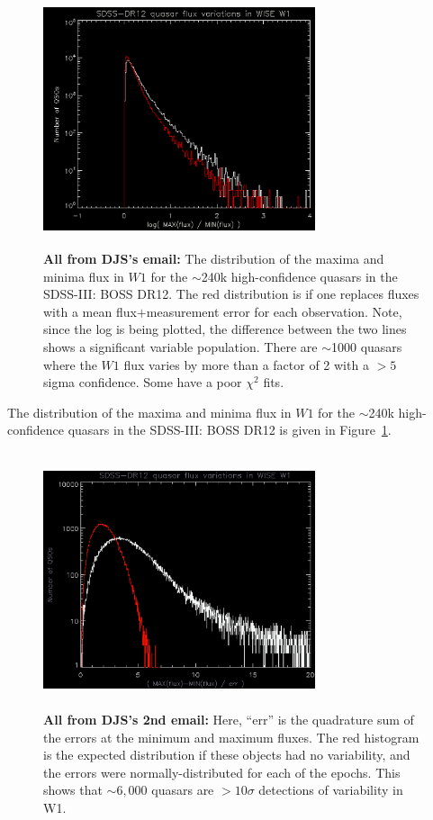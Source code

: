 \documentclass{emulateapj}
\begin{document}
\begin{figure}
  \includegraphics[width=8.00cm, height=7.50cm, trim=0.0cm 0.0cm 0.0cm 0.0cm, clip]
  {fig1.png}
  \centering
  \caption[]{
    {\bf All from DJS's email:} The distribution of the maxima and
    minima flux in $W1$ for the $\sim$240k high-confidence quasars in the
    SDSS-III: BOSS DR12.  The red distribution is if one replaces fluxes
    with a mean flux$+$measurement error for each observation.  Note,
    since the log is being plotted, the difference between the two lines
    shows a significant variable population.  There are $\sim$1000 quasars
    where the $W1$ flux varies by more than a factor of 2 with a $>5$
    sigma confidence.  Some have a poor $\chi{^2}$ fits.
  }
 \label{fig:maxminflux}
\end{figure}
The distribution of the maxima and minima flux in $W1$ for the
$\sim$240k high-confidence quasars in the SDSS-III: BOSS DR12 is given
in Figure~\ref{fig:maxminflux}.

\begin{figure}
  \includegraphics[width=8.00cm, height=7.50cm, trim=0.0cm 0.0cm 0.0cm 0.0cm, clip]
  {fig2.png}
  \centering
  \caption[]{
    {\bf All from DJS's 2nd email:} 
Here, ``err'' is the quadrature sum of the errors at the minimum and maximum fluxes.
The red histogram is the expected distribution if these objects had no variability, 
and the errors were normally-distributed for each of the epochs.
This shows that $\sim6,000$ quasars are $>10\sigma$ detections of variability in W1.
  }
 \label{fig:maxmin_err}
\end{figure}
\end{document}
